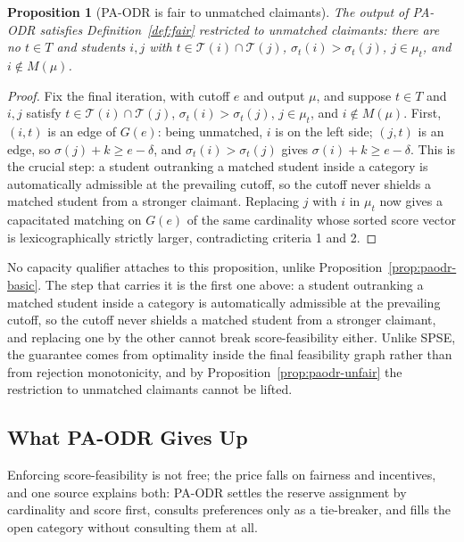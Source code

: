 \documentclass[a4paper,twoside]{article}
\newtheorem{proposition}{Proposition}
\theoremstyle{definition}
\renewcommand{\T}{\mathcal{T}}
\begin{document}
\begin{proposition}[PA-ODR is fair to unmatched claimants]
\label{prop:paodr-fair}
The output of PA-ODR satisfies Definition~\ref{def:fair} restricted to unmatched claimants: there are no $t\in T$ and students $i,j$ with $t\in\T(i)\cap\T(j)$, $\sigma_t(i)>\sigma_t(j)$, $j\in\mu_t$, and $i\notin M(\mu)$.
\end{proposition}

\begin{proof}
Fix the final iteration, with cutoff $e$ and output $\mu$, and suppose $t\in T$ and $i,j$ satisfy $t\in\T(i)\cap\T(j)$, $\sigma_t(i)>\sigma_t(j)$, $j\in\mu_t$, and $i\notin M(\mu)$. First, $(i,t)$ is an edge of $G(e)$: being unmatched, $i$ is on the left side; $(j,t)$ is an edge, so $\sigma(j)+k\ge e-\delta$, and $\sigma_t(i)>\sigma_t(j)$ gives $\sigma(i)+k\ge e-\delta$. This is the crucial step: a student outranking a matched student inside a category is automatically admissible at the prevailing cutoff, so the cutoff never shields a matched student from a stronger claimant. Replacing $j$ with $i$ in $\mu_t$ now gives a capacitated matching on $G(e)$ of the same cardinality whose sorted score vector is lexicographically strictly larger, contradicting criteria 1 and 2.
\end{proof}

No capacity qualifier attaches to this proposition, unlike Proposition~\ref{prop:paodr-basic}. The step that carries it is the first one above: a student outranking a matched student inside a category is automatically admissible at the prevailing cutoff, so the cutoff never shields a matched student from a stronger claimant, and replacing one by the other cannot break score-feasibility either. Unlike SPSE, the guarantee comes from optimality inside the final feasibility graph rather than from rejection monotonicity, and by Proposition~\ref{prop:paodr-unfair} the restriction to unmatched claimants cannot be lifted.

\subsection{What PA-ODR Gives Up}
\label{sec:paodr-limits}

Enforcing score-feasibility is not free; the price falls on fairness and incentives, and one source explains both: PA-ODR settles the reserve assignment by cardinality and score first, consults preferences only as a tie-breaker, and fills the open category without consulting them at all.
\end{document}
